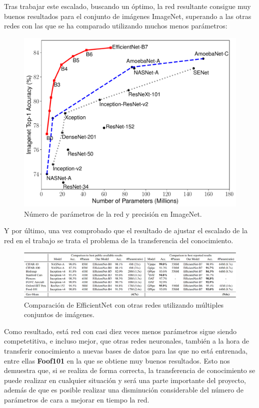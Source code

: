 Tras trabajar este escalado, buscando un óptimo, la red resultante consigue muy buenos resultados para el conjunto de imágenes ImageNet, superando a las otras redes con las que se ha comparado utilizando muchos menos parámetros:

\begin{figure}[H]
  \centering
  \includegraphics[width=0.5\linewidth]{Imagenes/params.pdf}
  \caption{Número de parámetros de la red y precisión en ImageNet.}
  \label{fig:param-precision}
\end{figure}

Y por último, una vez comprobado que el resultado de ajustar el escalado de la red en el trabajo se trata el problema de la transferencia del conocimiento.

\begin{figure}[H]
  \centering
  \includegraphics[width=1\linewidth]{Imagenes/cmp-efficient.png}
  \caption{Comparación de EfficientNet con otras redes utilizando múltiples conjuntos de imágenes.}
  \label{fig:param-precision}
\end{figure}

Como resultado, está red con casi diez veces menos parámetros sigue siendo competetitiva, e incluso mejor, que otras redes neuronales, también a la hora de transferir conocimiento a nuevas bases de datos para las que no está entrenada, entre ellas \textbf{Foof101} en la que se obtiene muy buenos resultados. Esto nos demuestra que, si se realiza de forma correcta, la transferencia de conocimiento se puede realizar en cualquier situación y será una parte importante del proyecto, además de que es posible realizar una disminución considerable del número de parámetros de cara a mejorar en tiempo la red.



